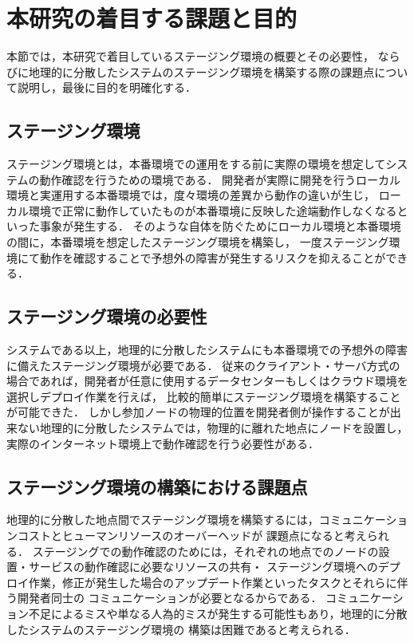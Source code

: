 \section{本研究の着目する課題と目的}
\label{introduction:issue-and-aim}
本節では，本研究で着目しているステージング環境の概要とその必要性，
ならびに地理的に分散したシステムのステージング環境を構築する際の課題点について説明し，最後に目的を明確化する．

\subsection{ステージング環境}
ステージング環境とは，本番環境での運用をする前に実際の環境を想定してシステムの動作確認を行うための環境である．
開発者が実際に開発を行うローカル環境と実運用する本番環境では，度々環境の差異から動作の違いが生じ，
ローカル環境で正常に動作していたものが本番環境に反映した途端動作しなくなるといった事象が発生する．
そのような自体を防ぐためにローカル環境と本番環境の間に，本番環境を想定したステージング環境を構築し，
一度ステージング環境にて動作を確認することで予想外の障害が発生するリスクを抑えることができる．

\subsection{ステージング環境の必要性}
システムである以上，地理的に分散したシステムにも本番環境での予想外の障害に備えたステージング環境が必要である．
従来のクライアント・サーバ方式の場合であれば，開発者が任意に使用するデータセンターもしくはクラウド環境を選択しデプロイ作業を行えば，
比較的簡単にステージング環境を構築することが可能できた．
しかし参加ノードの物理的位置を開発者側が操作することが出来ない地理的に分散したシステムでは，物理的に離れた地点にノードを設置し，
実際のインターネット環境上で動作確認を行う必要性がある．

\subsection{ステージング環境の構築における課題点}
\label{introduction:issue-and-aim:issue}
地理的に分散した地点間でステージング環境を構築するには，コミュニケーションコストとヒューマンリソースのオーバーヘッドが
課題点になると考えられる．
ステージングでの動作確認のためには，それぞれの地点でのノードの設置・サービスの動作確認に必要なリソースの共有・
ステージング環境へのデプロイ作業，修正が発生した場合のアップデート作業といったタスクとそれらに伴う開発者同士の
コミュニケーションが必要となるからである．
コミュニケーション不足によるミスや単なる人為的ミスが発生する可能性もあり，地理的に分散したシステムのステージング環境の
構築は困難であると考えられる．

